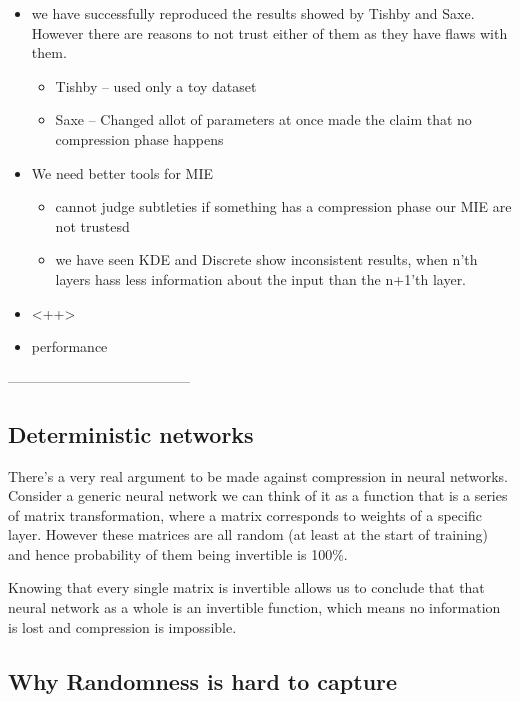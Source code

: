 \documentclass[dissertation.tex]{subfiles}
\begin{document}
\begin{itemize}
  \item{
      we have successfully reproduced the results showed by Tishby and Saxe.
      However there are reasons to not trust either of them as they have flaws
      with them.
      \begin{itemize}
        \item{
            Tishby -- used only a toy dataset 
          }
        \item{
            Saxe -- Changed allot of parameters at once made the claim that no
            compression phase happens
          }
      \end{itemize}
    }
  \item{
      We need better tools for MIE
      \begin{itemize}
        \item{
            cannot judge subtleties if something has a compression phase our MIE
            are not trustesd
          }
        \item{
            we have seen KDE and Discrete show inconsistent results, when n'th
            layers hass less information about the input than the n+1'th layer.
          }
      \end{itemize}
    }
  \item{
      <++>
    }
  \item{
      performance
    }
\end{itemize}

---------------------------------------

\subsection{Deterministic networks} \label{ssection:detnet}

There's a very real argument to be made against compression in neural networks.
Consider a generic neural network we can think of it as a function that is a
series of matrix transformation, where a matrix corresponds to weights of a
specific layer. However these matrices are all random (at least at the start of
training) and hence probability of them being invertible is 100\%. 

Knowing that every single matrix is invertible allows us to conclude that that
neural network as a whole is an invertible function, which means no information
is lost and compression is impossible.



\subsection{Why Randomness is hard to capture} \label{ssection:rename}
\end{document}
